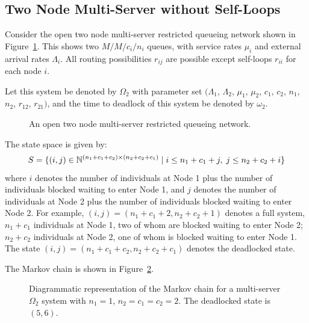 \documentclass{article}
\numberwithin{equation}{section}
\begin{document}
\subsection{Two Node Multi-Server without Self-Loops}\label{sec:2nodeMS}

Consider the open two node multi-server restricted queueing network shown in
Figure~\ref{fig:queueingnetwork_2nodemulti}.
This shows two \(M/M/c_i/n_i\) queues, with service rates $\mu_i$ and external
arrival rates $\Lambda_i$.
All routing possibilities $r_{ij}$ are possible except self-loops $r_{ii}$ for
each node $i$.

Let this system be denoted by $\Omega_2$ with parameter set $(\Lambda_1$,
$\Lambda_2$, $\mu_1$, $\mu_2$, $c_1$, $c_2$, $n_1$, $n_2$, $r_{12}$, $r_{21})$,
and the time to deadlock of this system be denoted by $\omega_2$.

\begin{figure}[!htbp]
  \begin{center}
  
  \end{center}
  \caption{An open two node multi-server restricted queueing network.}
  \label{fig:queueingnetwork_2nodemulti}
\end{figure}

The state space is given by:
        \[S = \{(i,j)\in\mathbb{N}^{(n_1+c_1+c_2)\times (n_2+c_2+c_1)} \nonscript\; | \nonscript\; i \leq n_1+c_1+j, \nonscript\; j \leq n_2+c_2+i\}\]
where $i$ denotes the number of individuals at Node 1 plus the number of
individuals blocked waiting to enter Node 1, and $j$ denotes the number of
individuals at Node 2 plus the number of individuals blocked waiting to enter
Node 2.
For example, $(i, j) = (n_1+c_1+2, n_2+c_2+1)$ denotes a full system,
$n_1+c_1$ individuals at Node 1, two of whom are blocked waiting to enter
Node 2; $n_2+c_2$ individuals at Node 2, one of whom is blocked waiting to
enter Node 1.
The state $(i, j) = (n_1+c_1+c_2, n_2+c_2+c_1)$ denotes the deadlocked state.

The Markov chain is shown in Figure~\ref{fig:2nodeMCms}.

\begin{figure}[!htbp]
    
    \caption{Diagrammatic representation of the Markov chain for a
    multi-server $\Omega_2$ system with $n_1=1$, $n_2=c_1=c_2=2$.
    The deadlocked state is $(5,6)$.}
    \label{fig:2nodeMCms}
\end{figure}
\end{document}
